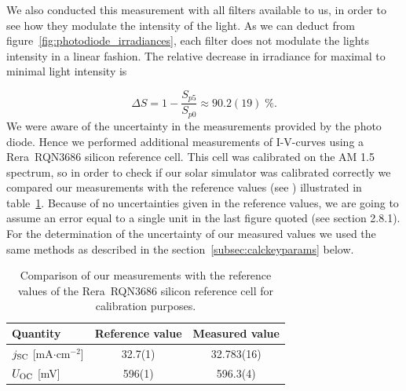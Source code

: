 \documentclass[a4paper,10pt,twocolumn]{article}
\begin{document}
\begin{extract*}
We also conducted this measurement with all filters available to us, in order to see how they modulate the intensity of the light. As we can deduct from figure~\ref{fig:photodiode_irradiances}, each filter does not modulate the lights intensity in a linear fashion. The relative decrease in irradiance for maximal to minimal light intensity is

\begin{equation}\label{eq:irrad-decrease}
	\Delta S = 1 - \frac{S_{p5}}{S_{p0}} \approx 90.2(19)\;\%.
\end{equation}
We were aware of the uncertainty in the measurements provided by the photo diode. Hence we performed additional measurements of I-V-curves using a Rera~RQN3686 silicon reference cell. This cell was calibrated on the AM 1.5 spectrum, so in order to check if our solar simulator was calibrated correctly we compared our measurements with the reference values (see \cite{reracat}) illustrated in table~\ref{tab:reracomp}. Because of no uncertainties given in the reference values, we are going to assume an error equal to a single unit in the last figure quoted (see \cite{measurements} section 2.8.1). For the determination of the uncertainty of our measured values we used the same methods as described in the section~\ref{subsec:calckeyparams} below. 
\begin{table}[h]\centering
	\caption{Comparison of our measurements with the reference values of the Rera~RQN3686 silicon reference cell for calibration purposes.}
	\label{tab:reracomp}
	\begin{tabular}{@{}lcc@{}}\toprule
		Quantity & Reference value & Measured value\\ \midrule
		$j_{\text{SC}}$ [mA$\cdot$cm$^{-2}$] & 32.7(1) & 32.783(16) \\
		$U_{\text{OC}}$ [mV]& 596(1) & 596.3(4) \\ \bottomrule
	\end{tabular}
\end{table}


\end{extract*}
\end{document}
